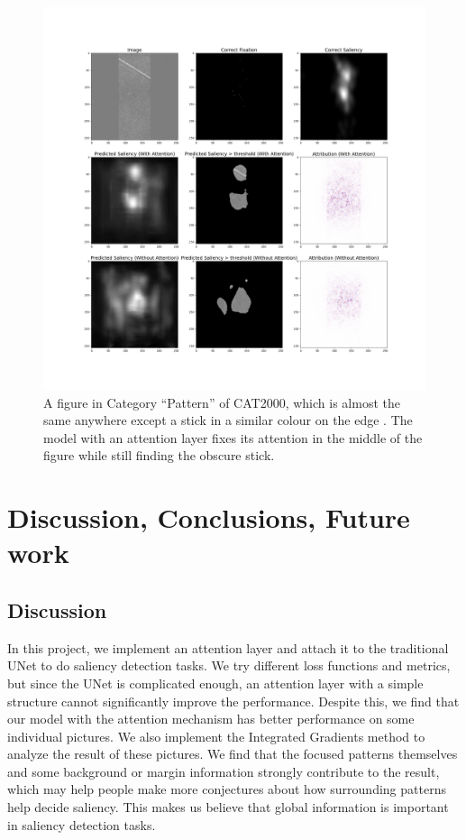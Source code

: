 \documentclass[12pt]{article}
\begin{document}
\begin{figure}[h!]
    \centering
    \includegraphics[width=7in]{imgs/used_example_2.png}
    \caption{A figure in Category ``Pattern'' of CAT2000, which is almost the same anywhere except a stick in a similar colour on the edge . The model with an attention layer fixes its attention in the middle of the figure while still finding the obscure stick.}
    \label{img:int_example_2}
\end{figure}







\section{Discussion, Conclusions, Future work}
\subsection{Discussion}

In this project, we implement an attention layer and attach it to the traditional UNet to do saliency detection tasks.
We try different loss functions and metrics, but since the UNet is complicated enough, an attention layer with a simple structure cannot significantly improve the performance.
Despite this, we find that our model with the attention mechanism has better performance on some individual pictures.
We also implement the Integrated Gradients method to analyze the result of these pictures.
We find that the focused patterns themselves and some background or margin information strongly contribute to the result, which may help people make more conjectures about how surrounding patterns help decide saliency.
This makes us believe that global information is important in saliency detection tasks.
\end{document}
